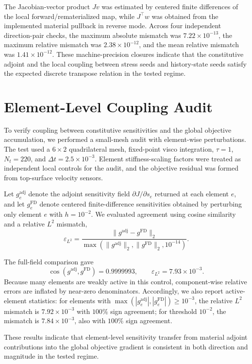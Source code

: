 \documentclass[11pt]{article}
\begin{document}
The Jacobian-vector product \(Jv\) was estimated by centered finite differences of the local forward/rematerialized map, while \(J^\top w\) was obtained from the implemented material pullback in reverse mode.
Across four independent direction-pair checks, the maximum absolute mismatch was \(7.22\times10^{-13}\), the maximum relative mismatch was \(2.38\times10^{-12}\), and the mean relative mismatch was \(1.41\times10^{-12}\).
These machine-precision closures indicate that the constitutive adjoint and the local coupling between stress seeds and history-state seeds satisfy the expected discrete transpose relation in the tested regime.

\section{Element-Level Coupling Audit}
To verify coupling between constitutive sensitivities and the global objective accumulation, we performed a small-mesh audit with element-wise perturbations.
The test used a \(6\times2\) quadrilateral mesh, fixed-point visco integration, \(\tau=1\), \(N_t=220\), and \(\Delta t=2.5\times10^{-3}\).
Element stiffness-scaling factors were treated as independent local controls for the audit, and the objective residual was formed from top-surface velocity sensors.

Let \(g^{\mathrm{adj}}_e\) denote the adjoint sensitivity field \(\partial J/\partial s_e\) returned at each element \(e\), and let \(g^{\mathrm{FD}}_e\) denote centered finite-difference sensitivities obtained by perturbing only element \(e\) with \(h=10^{-2}\).
We evaluated agreement using cosine similarity and a relative \(L^2\) mismatch,
\[
\varepsilon_{L^2}=\frac{\|g^{\mathrm{adj}}-g^{\mathrm{FD}}\|_2}
{\max(\|g^{\mathrm{adj}}\|_2,\|g^{\mathrm{FD}}\|_2,10^{-14})}.
\]

The full-field comparison gave
\[
\cos(g^{\mathrm{adj}},g^{\mathrm{FD}})=0.9999993,\qquad
\varepsilon_{L^2}=7.93\times10^{-3}.
\]
Because many elements are weakly active in this control, component-wise relative errors are inflated by near-zero denominators.
Accordingly, we also report active-element statistics: for elements with \(\max(|g^{\mathrm{adj}}_e|,|g^{\mathrm{FD}}_e|)\ge 10^{-3}\), the relative \(L^2\) mismatch is \(7.92\times10^{-3}\) with \(100\%\) sign agreement; for threshold \(10^{-2}\), the mismatch is \(7.84\times10^{-3}\), also with \(100\%\) sign agreement.

These results indicate that element-level sensitivity transfer from material adjoint contributions into the global objective gradient is consistent in both direction and magnitude in the tested regime.
\end{document}
